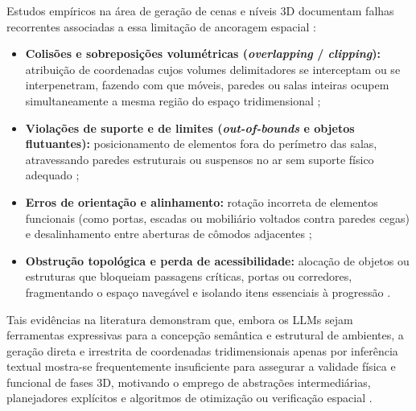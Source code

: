 Estudos empíricos na área de geração de cenas e níveis 3D documentam falhas recorrentes associadas a essa limitação de ancoragem espacial \cite{ocal2024sceneteller, hu2024scenecraft, sun2024roomplanner, xu2025constraint, feng2026repurposing3dgenerativemodel, yang2026codeasroomgenerating3drooms, bandeali2026generative}:
\begin{itemize}
    \item \textbf{Colisões e sobreposições volumétricas (\textit{overlapping} / \textit{clipping}):} atribuição de coordenadas cujos volumes delimitadores se interceptam ou se interpenetram, fazendo com que móveis, paredes ou salas inteiras ocupem simultaneamente a mesma região do espaço tridimensional \cite{ocal2024sceneteller, sun2024roomplanner, xu2025constraint, feng2026repurposing3dgenerativemodel};
    \item \textbf{Violações de suporte e de limites (\textit{out-of-bounds} e objetos flutuantes):} posicionamento de elementos fora do perímetro das salas, atravessando paredes estruturais ou suspensos no ar sem suporte físico adequado \cite{ocal2024sceneteller, sun2024roomplanner, xu2025constraint, feng2026repurposing3dgenerativemodel, bandeali2026generative};
    \item \textbf{Erros de orientação e alinhamento:} rotação incorreta de elementos funcionais (como portas, escadas ou mobiliário voltados contra paredes cegas) e desalinhamento entre aberturas de cômodos adjacentes \cite{sun2024roomplanner, xu2025constraint, yang2026codeasroomgenerating3drooms};
    \item \textbf{Obstrução topológica e perda de acessibilidade:} alocação de objetos ou estruturas que bloqueiam passagens críticas, portas ou corredores, fragmentando o espaço navegável e isolando itens essenciais à progressão \cite{sun2024roomplanner, xu2025constraint, xu2025databasedrivenframework3dlevel}.
\end{itemize}

Tais evidências na literatura demonstram que, embora os LLMs sejam ferramentas expressivas para a concepção semântica e estrutural de ambientes, a geração direta e irrestrita de coordenadas tridimensionais apenas por inferência textual mostra-se frequentemente insuficiente para assegurar a validade física e funcional de fases 3D, motivando o emprego de abstrações intermediárias, planejadores explícitos e algoritmos de otimização ou verificação espacial \cite{hu2024scenecraft, sun2024roomplanner, xu2025constraint, xu2025databasedrivenframework3dlevel, yang2026codeasroomgenerating3drooms}.

